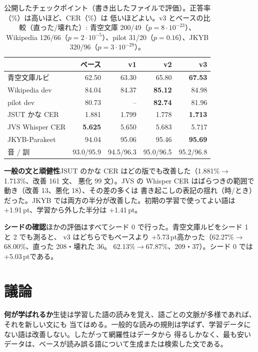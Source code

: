 \documentclass[10pt,a4paper,twocolumn]{article}
\newcommand{\pt}{\,pt}
\begin{document}
\begin{table}[t]
\centering
\caption{公開したチェックポイント（書き出したファイルで評価）。正答率（\%）は高いほど、CER（\%）は
低いほどよい。v3 とベースの比較（直った/壊れた）: 青空文庫 200/49（$p{=}8\cdot10^{-23}$）、Wikipedia
126/66（$p{=}2\cdot10^{-5}$）、pilot 31/20（$p{=}0.16$）、JKYB 320/96（$p{=}3\cdot10^{-29}$）。}
\label{tab:release}
\footnotesize\setlength{\tabcolsep}{3.5pt}
\begin{tabular}{@{}lrrrr@{}}
\toprule
& ベース & v1 & v2 & v3\\
\midrule
青空文庫ルビ & 62.50 & 63.30 & 65.80 & \textbf{67.53}\\
Wikipedia dev & 84.04 & 84.37 & \textbf{85.12} & 84.98\\
pilot dev & 80.73 & -- & \textbf{82.74} & 81.96\\
JSUT かな CER & 1.881 & 1.799 & 1.778 & \textbf{1.713}\\
JVS Whisper CER & \textbf{5.625} & 5.650 & 5.683 & 5.717\\
JKYB-Parakeet & 94.04 & 95.06 & 95.46 & \textbf{95.69}\\
\quad 音 / 訓 & 93.0/95.9 & 94.5/96.3 & 95.0/96.5 & 95.2/96.8\\
\bottomrule
\end{tabular}
\end{table}

\textbf{一般の文と頑健性}\quad JSUT のかな CER はどの版でも改善した（1.881\%$\to$1.713\%、改善 161 文、
悪化 99 文）。JVS の Whisper CER はばらつきの範囲で動き（改善 13、悪化 18）、その差の多くは
書き起こしの表記の揺れ（時/とき）だった。JKYB では両方の半分が改善した。初期の学習で使ってよい語は
+1.91\pt、学習から外した半分は +1.41\pt。

\textbf{シードの確認}\quad ほかの評価はすべてシード 0 で行った。青空文庫ルビをシード 1 と 2 でも測ると、
v3 はどちらでもベースより +5.73\pt 高かった（62.27\%$\to$68.00\%、直った 208・壊れた 36。
62.13\%$\to$67.87\%、209・37）。シード 0 では +5.03\pt である。

\section{議論}
\textbf{何が学ばれるか}\quad 生徒は学習した語の読みを覚え、語ごとの文脈が多様であれば、それを新しい文にも
当てはめる。一般的な読みの規則は学ばず、学習データにない語は改善しない。したがって網羅性はデータから
得るしかなく、最も安いデータは、ベースが読み誤る語について生成または検索した文である。
\end{document}
